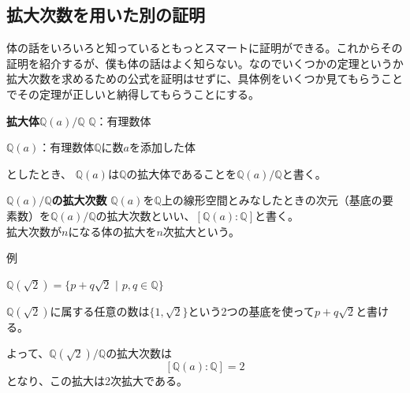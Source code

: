 \subsection{拡大次数を用いた別の証明}
体の話をいろいろと知っているともっとスマートに証明ができる。これからその証明を紹介するが、僕も体の話はよく知らない。なのでいくつかの定理というか拡大次数を求めるための公式を証明はせずに、具体例をいくつか見てもらうことでその定理が正しいと納得してもらうことにする。
\begin{itembox}[l]{\bf 拡大体$\mathbb{Q}(a)/\mathbb{Q}$}
$\mathbb{Q}$：有理数体\par
$\mathbb{Q}(a)$：有理数体$\mathbb{Q}$に数$a$を添加した体\par
としたとき、
$\mathbb{Q}(a)$は$\mathbb{Q}$の{\gt 拡大体}であることを$\mathbb{Q}(a)/\mathbb{Q}$と書く。
\end{itembox}

\begin{itembox}[l]{\bf $\mathbb{Q}(a)/\mathbb{Q}$の拡大次数}
$\mathbb{Q}(a)$を$\mathbb{Q}$上の線形空間とみなしたときの{\gt 次元}（基底の要素数）を$\mathbb{Q}(a)/\mathbb{Q}$の{\gt 拡大次数}といい、$[\mathbb{Q}(a):\mathbb{Q}]$と書く。\\
拡大次数が$n$になる体の拡大を{\gt $n$次拡大}という。
\end{itembox}
{\gt 例}\par
$\mathbb{Q}(\sqrt{2}) = \{p + q\sqrt{2} \,\,|\,\, p,q \in \mathbb{Q}\}$ \par
$\mathbb{Q}(\sqrt{2})$に属する任意の数は$\{ 1, \sqrt{2} \}$という2つの基底を使って$p + q\sqrt{2}$と書ける。\par
よって、$\mathbb{Q}(\sqrt{2})/\mathbb{Q}$の拡大次数は
$$[\mathbb{Q}(a):\mathbb{Q}] = 2$$
となり、この拡大は2次拡大である。

